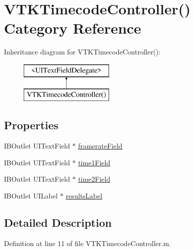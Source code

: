 \hypertarget{category_v_t_k_timecode_controller_07_08}{\section{V\+T\+K\+Timecode\+Controller() Category Reference}
\label{category_v_t_k_timecode_controller_07_08}
}
Inheritance diagram for V\+T\+K\+Timecode\+Controller()\+:\begin{figure}[H]
\begin{center}
\leavevmode
\includegraphics[height=2.000000cm]{category_v_t_k_timecode_controller_07_08}
\end{center}
\end{figure}
\subsection*{Properties}
\begin{DoxyCompactItemize}
\item 
I\+B\+Outlet U\+I\+Text\+Field $\ast$ \hyperlink{category_v_t_k_timecode_controller_07_08_a01e4a2a269595de1df65c643f67ae3c6}{framerate\+Field}
\item 
I\+B\+Outlet U\+I\+Text\+Field $\ast$ \hyperlink{category_v_t_k_timecode_controller_07_08_a24852fbe59ab28cd6a03cd87f63233fa}{time1\+Field}
\item 
I\+B\+Outlet U\+I\+Text\+Field $\ast$ \hyperlink{category_v_t_k_timecode_controller_07_08_a91d07bcd511c8dead712ccbda0ef0ba1}{time2\+Field}
\item 
I\+B\+Outlet U\+I\+Label $\ast$ \hyperlink{category_v_t_k_timecode_controller_07_08_a4e46e7e9fbc90e39d28dcf2e0962c891}{results\+Label}
\end{DoxyCompactItemize}


\subsection{Detailed Description}


Definition at line 11 of file V\+T\+K\+Timecode\+Controller.\+m.



